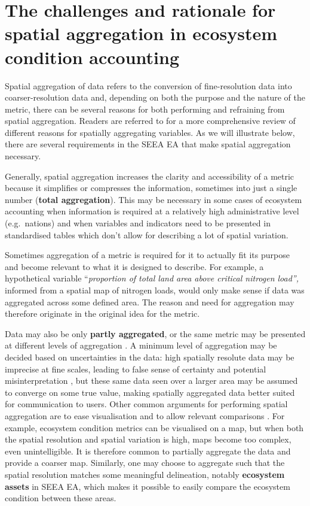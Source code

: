 \documentclass[
  authoryear,
  preprint,
  3p]{elsarticle}
\begin{document}
\section{The challenges and rationale for spatial aggregation in
ecosystem condition
accounting}\label{the-challenges-and-rationale-for-spatial-aggregation-in-ecosystem-condition-accounting}

Spatial aggregation of data refers to the conversion of fine-resolution
data into coarser-resolution data and, depending on both the purpose and
the nature of the metric, there can be several reasons for both
performing and refraining from spatial aggregation. Readers are referred
to \citet{allain2018} for a more comprehensive review of different
reasons for spatially aggregating variables. As we will illustrate
below, there are several requirements in the SEEA EA that make spatial
aggregation necessary.

Generally, spatial aggregation increases the clarity and accessibility
of a metric because it simplifies or compresses the information,
sometimes into just a single number (\textbf{total aggregation}). This
may be necessary in some cases of ecosystem accounting when information
is required at a relatively high administrative level (e.g.~nations) and
when variables and indicators need to be presented in standardised
tables which don't allow for describing a lot of spatial variation.

Sometimes aggregation of a metric is required for it to actually fit its
purpose and become relevant to what it is designed to describe. For
example, a hypothetical variable ``\emph{proportion of total land area
above critical nitrogen load'',} informed from a spatial map of nitrogen
loads, would only make sense if data was aggregated across some defined
area. The reason and need for aggregation may therefore originate in the
original idea for the metric.

Data may also be only \textbf{partly aggregated}, or the same metric may
be presented at different levels of aggregation \citep{allain2018}. A
minimum level of aggregation may be decided based on uncertainties in
the data: high spatially resolute data may be imprecise at fine scales,
leading to false sense of certainty and potential misinterpretation
\citep{lyytimäki2013}, but these same data seen over a larger area may
be assumed to converge on some true value, making spatially aggregated
data better suited for communication to users. Other common arguments
for performing spatial aggregation are to ease visualisation and to
allow relevant comparisons \citep{allain2018}. For example, ecosystem
condition metrics can be visualised on a map, but when both the spatial
resolution and spatial variation is high, maps become too complex, even
unintelligible. It is therefore common to partially aggregate the data
and provide a coarser map. Similarly, one may choose to aggregate such
that the spatial resolution matches some meaningful delineation, notably
\textbf{ecosystem assets} in SEEA EA, which makes it possible to easily
compare the ecosystem condition between these areas.
\end{document}
